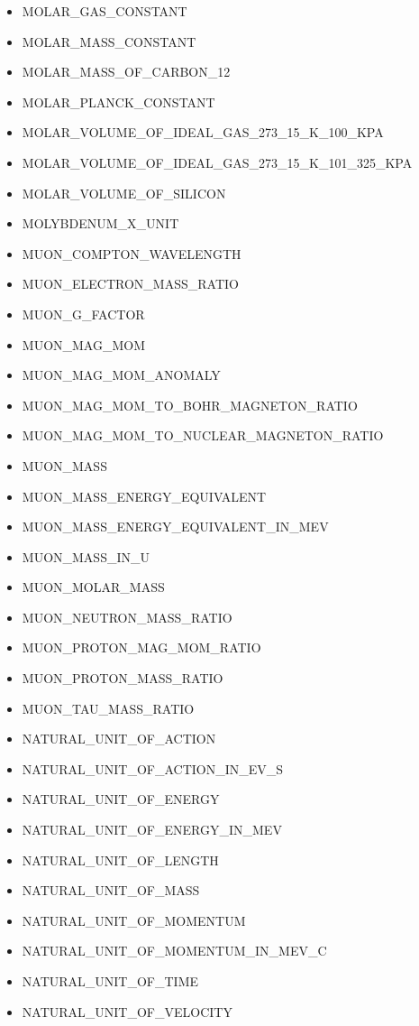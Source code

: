 \begin{itemize}
  MAG\_FLUX\_QUANTUM
\item
  MOLAR\_GAS\_CONSTANT
\item
  MOLAR\_MASS\_CONSTANT
\item
  MOLAR\_MASS\_OF\_CARBON\_12
\item
  MOLAR\_PLANCK\_CONSTANT
\item
  MOLAR\_VOLUME\_OF\_IDEAL\_GAS\_273\_15\_K\_100\_KPA
\item
  MOLAR\_VOLUME\_OF\_IDEAL\_GAS\_273\_15\_K\_101\_325\_KPA
\item
  MOLAR\_VOLUME\_OF\_SILICON
\item
  MOLYBDENUM\_X\_UNIT
\item
  MUON\_COMPTON\_WAVELENGTH
\item
  MUON\_ELECTRON\_MASS\_RATIO
\item
  MUON\_G\_FACTOR
\item
  MUON\_MAG\_MOM
\item
  MUON\_MAG\_MOM\_ANOMALY
\item
  MUON\_MAG\_MOM\_TO\_BOHR\_MAGNETON\_RATIO
\item
  MUON\_MAG\_MOM\_TO\_NUCLEAR\_MAGNETON\_RATIO
\item
  MUON\_MASS
\item
  MUON\_MASS\_ENERGY\_EQUIVALENT
\item
  MUON\_MASS\_ENERGY\_EQUIVALENT\_IN\_MEV
\item
  MUON\_MASS\_IN\_U
\item
  MUON\_MOLAR\_MASS
\item
  MUON\_NEUTRON\_MASS\_RATIO
\item
  MUON\_PROTON\_MAG\_MOM\_RATIO
\item
  MUON\_PROTON\_MASS\_RATIO
\item
  MUON\_TAU\_MASS\_RATIO
\item
  NATURAL\_UNIT\_OF\_ACTION
\item
  NATURAL\_UNIT\_OF\_ACTION\_IN\_EV\_S
\item
  NATURAL\_UNIT\_OF\_ENERGY
\item
  NATURAL\_UNIT\_OF\_ENERGY\_IN\_MEV
\item
  NATURAL\_UNIT\_OF\_LENGTH
\item
  NATURAL\_UNIT\_OF\_MASS
\item
  NATURAL\_UNIT\_OF\_MOMENTUM
\item
  NATURAL\_UNIT\_OF\_MOMENTUM\_IN\_MEV\_C
\item
  NATURAL\_UNIT\_OF\_TIME
\item
  NATURAL\_UNIT\_OF\_VELOCITY

\end{itemize}
